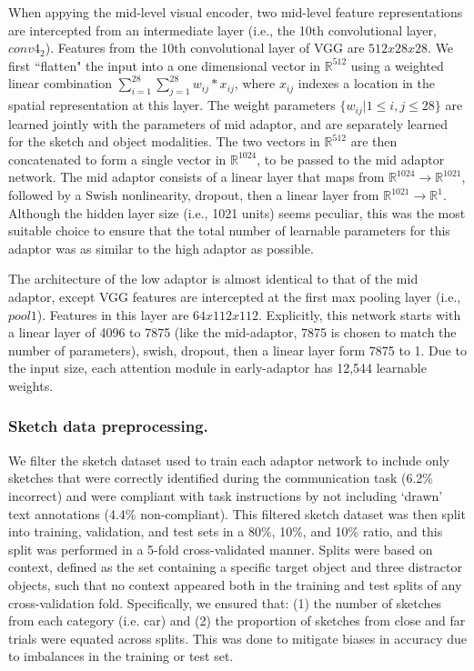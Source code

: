 \documentclass[9pt,twocolumn,twoside]{pnas-new}
\begin{document}
{When appying the mid-level visual encoder, two mid-level feature representations are intercepted from an intermediate layer (i.e., the 10th convolutional layer, $conv4_2$).
Features from the 10th convolutional layer of VGG are $512 x 28 x 28$.
We first ``flatten" the input into a one dimensional vector in $\mathbb{R}^{512}$ using a weighted linear combination $\sum_{i=1}^{28}\sum_{j=1}^{28} w_{ij} * x_{ij}$, where $x_{ij}$ indexes a location in the spatial representation at this layer. 
The weight parameters  $\{w_{ij}|1\leq i,j \leq 28\}$ are learned jointly with the parameters of mid adaptor, and are separately learned for the sketch and object modalities. 
The two vectors in $\mathbb{R}^{512}$ are then concatenated to form a single vector in $\mathbb{R}^{1024}$, to be passed to the mid adaptor network. 
The mid adaptor consists of a linear layer that maps from $\mathbb{R}^{1024} \rightarrow \mathbb{R}^{1021}$, followed by a Swish nonlinearity, dropout, then a linear layer from $\mathbb{R}^{1021} \rightarrow \mathbb{R}^{1}$. 
Although the hidden layer size (i.e., 1021 units) seems peculiar, this was the most suitable choice to ensure that the total number of learnable parameters for this adaptor was as similar to the high adaptor as possible. 

The architecture of the low adaptor is almost identical to that of the mid adaptor, except VGG features are intercepted at the first max pooling layer (i.e., $pool1$).
Features in this layer are $64 x 112 x 112$. 
Explicitly, this network starts with a linear layer of 4096 to 7875 (like the mid-adaptor, 7875 is chosen to match the number of parameters), swish, dropout, then a linear layer form 7875 to 1. Due to the input size, each attention module in early-adaptor has 12,544 learnable weights.

\subsubsection{Sketch data preprocessing.} We filter the sketch dataset used to train each adaptor network to include only sketches that were correctly identified during the communication task (6.2\% incorrect) and were compliant with task instructions by not including `drawn' text annotations (4.4\% non-compliant). This filtered sketch dataset was then split into training, validation, and test sets in a 80\%, 10\%, and 10\% ratio, and this split was performed in a 5-fold cross-validated manner. Splits were based on context, defined as the set containing a specific target object and three distractor objects, such that no context appeared both in the training and test splits of any cross-validation fold. Specifically, we ensured that: (1) the number of sketches from each category (i.e. car) and (2) the proportion of sketches from close and far trials were equated across splits. This was done to mitigate biases in accuracy due to imbalances in the training or test set.

}
\end{document}
